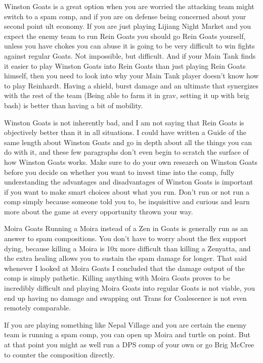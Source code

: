 Winston Goats is a great option when you are worried the attacking team might switch to a spam comp, and if you are on defense being concerned about your second point ult economy. If you are just playing Lijiang Night Market and you expect the enemy team to run Rein Goats you should go Rein Goats yourself, unless you have chokes you can abuse it is going to be very difficult to win fights against regular Goats. Not impossible, but difficult. And if your Main Tank finds it easier to play Winston Goats into Rein Goats than just playing Rein Goats himself, then you need to look into why your Main Tank player doesn’t know how to play Reinhardt. Having a shield, burst damage and an ultimate that synergizes with the rest of the team (Being able to farm it in grav, setting it up with brig bash) is better than having a bit of mobility. 

Winston Goats is not inherently bad, and I am not saying that Rein Goats is objectively better than it in all situations. I could have written a Guide of the same length about Winston Goats and go in depth about all the things you can do with it, and these few paragraphs don’t even begin to scratch the surface of how Winston Goats works. Make sure to do your own research on Winston Goats before you decide on whether you want to invest time into the comp, fully understanding the advantages and disadvantages of Winston Goats is important if you want to make smart choices about what you run. Don’t run or not run a comp simply because someone told you to, be inquisitive and curious and learn more about the game at every opportunity thrown your way.


Moira Goats
Running a Moira instead of a Zen in Goats is generally run as an answer to spam compositions. You don’t have to worry about the flex support dying, because killing a Moira is 10x more difficult than killing a Zenyatta, and the extra healing allows you to sustain the spam damage for longer. That said whenever I looked at Moira Goats I concluded that the damage output of the comp is simply pathetic. 
Killing anything with Moira Goats proves to be incredibly difficult and playing Moira Goats into regular Goats is not viable, you end up having no damage and swapping out Trans for Coalescence is not even remotely comparable. 

If you are playing something like Nepal Village and you are certain the enemy team is running a spam comp, you can open up Moira and turtle on point. But at that point you might as well run a DPS comp of your own or go Brig McCree to counter the composition directly. 

